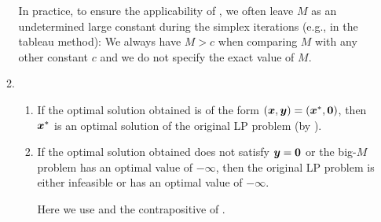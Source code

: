 \begin{enumerate}
\begin{enumerate}[label={(\arabic*)}]
\begin{note}
In practice, to ensure the applicability of , we
often leave \(M\) as an undetermined large constant during the simplex
iterations (e.g., in the tableau method): We always have \(M>c\) when comparing
\(M\) with any other constant \(c\) and we do not specify the exact value of
\(M\).
\end{note}
\item 
\begin{enumerate}
\item If the optimal solution obtained is of the form
\((\bm{x},\bm{y})=(\bm{x}^{*},\bm{0})\), then \(\bm{x}^*\) is an
optimal solution of the original LP problem (by ).
\item If the optimal solution obtained does not satisfy \(\bm{y}=\bm{0}\)
or the big-\(M\) problem has an optimal value of \(-\infty\), then the original
LP problem is either infeasible or has an optimal value of \(-\infty\).
\begin{note}
Here we use  and the contrapositive of
.
\end{note}
\end{enumerate}
\end{enumerate}
\end{enumerate}
